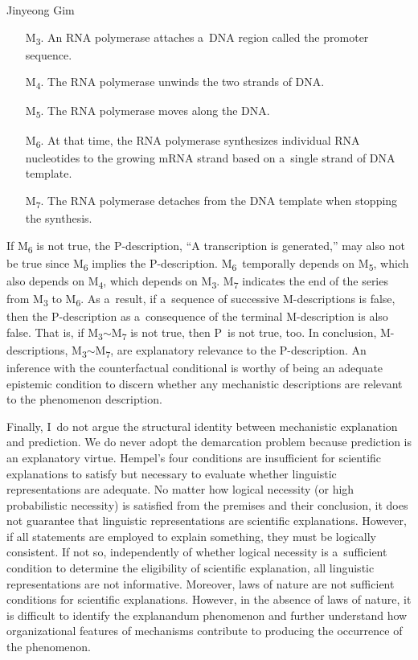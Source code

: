\begin{artengenv}{Jinyeong Gim}
\begin{itemize}
    \item[M\textsubscript{3}.] An RNA polymerase attaches a~DNA region called the promoter sequence.
    \item[M\textsubscript{4}.] The RNA polymerase unwinds the two strands of DNA.
    \item[M\textsubscript{5}.] The RNA polymerase moves along the DNA.
    \item[M\textsubscript{6}.] At that time, the RNA polymerase synthesizes individual RNA nucleotides to the growing mRNA strand based on a~single strand of DNA template.
    \item[M\textsubscript{7}.] The RNA polymerase detaches from the DNA template when stopping the synthesis.
\end{itemize}
\enlargethispage{1.5\baselineskip}


If M\textsubscript{6} is not true, the P-description, ``A transcription is generated,'' may also not be true since M\textsubscript{6} implies the P-description. M\textsubscript{6}~temporally depends on M\textsubscript{5}, which also depends on M\textsubscript{4}, which depends on M\textsubscript{3}. M\textsubscript{7} indicates the end of the series from M\textsubscript{3} to M\textsubscript{6}. As a~result, if a~sequence of successive M-descriptions is false, then the P-description as a~consequence of the terminal M-description is also false. That is, if M\textsubscript{3}$\sim$M\textsubscript{7} is not true, then P~is not true, too. In conclusion, M-descriptions, M\textsubscript{3}$\sim$M\textsubscript{7}, are explanatory relevance to the P-description. An inference with the counterfactual conditional is worthy of being an adequate epistemic condition to discern whether any mechanistic descriptions are relevant to the phenomenon description.

Finally, I~do not argue the structural identity between mechanistic explanation and prediction. We do never adopt the demarcation problem because prediction is an explanatory virtue. Hempel's four conditions are insufficient for scientific explanations to satisfy but necessary to evaluate whether linguistic representations are adequate. No matter how logical necessity (or high probabilistic necessity) is satisfied from the premises and their conclusion, it does not guarantee that linguistic representations are scientific explanations. However, if all statements are employed to explain something, they must be logically consistent. If not so, independently of whether logical necessity is a~sufficient condition to determine the eligibility of scientific explanation, all linguistic representations are not informative. Moreover, laws of nature are not sufficient conditions for scientific explanations. However, in the absence of laws of nature, it is difficult to identify the explanandum phenomenon and further understand how organizational features of mechanisms contribute to producing the occurrence of the phenomenon.


\end{artengenv}
